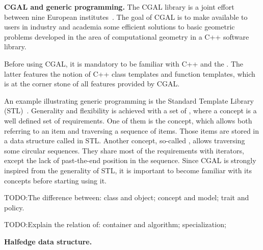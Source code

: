 \noindent \textbf{CGAL and generic programming.}
The CGAL library is a joint effort between nine European
institutes~\cite{fgkss-dccga-00}. The goal of CGAL is to make
available to users in industry and academia some efficient solutions
to basic geometric problems developed in the area of computational
geometry in a C++ software library.

Before using CGAL, it is mandatory to be familiar with C++ and the
. The latter features the notion
of C++ class templates and function templates, which is at the corner
stone of all features provided by CGAL.

An example illustrating generic programming is the Standard Template
Library (STL)~\cite{ms-stl-96}. Generality and flexibility is achieved
with a set of , where a concept is a well defined set
of requirements. One of them is the  concept, which
allows both referring to an item and traversing a sequence of
items. Those items are stored in a data structure called
 in STL. Another concept, so-called
, allows traversing some circular sequences. They
share most of the requirements with iterators, except the lack of
past-the-end position in the sequence. Since CGAL is strongly inspired
from the generality of STL, it is important to become familiar with
its concepts before starting using it.

TODO:The difference between: class and object; concept and model; 
trait and policy.

TODO:Explain the relation of: container and algorithm; specialization;

\noindent \textbf{Halfedge data structure.}

